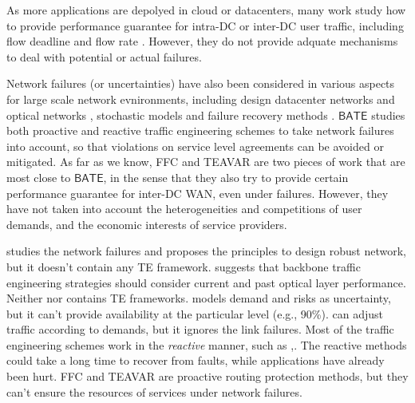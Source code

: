 \documentclass[sigconf]{acmart}
\begin{document}
As more applications are depolyed in cloud or datacenters, 
many work study how to provide performance guarantee for intra-DC or inter-DC user traffic, 
including flow deadline \cite{D2TCP, LPD, Guaranteeings} and flow rate \cite{appdriven, EyeQ}.
However, they do not provide adquate mechanisms to deal with potential or actual failures. 

Network failures (or uncertainties) have also been considered in various aspects for large scale network evnironments, including design datacenter networks \cite{evole} and optical networks \cite{Optical},  
stochastic models \cite{Stochastic} \cite{bi2019uncertainty-aware}
and failure recovery methods \cite{jointfailure, R3}. 
$\mathsf{BATE}$ studies both proactive and reactive traffic engineering schemes to 
take network failures into account, so that violations on service level agreements can be avoided or mitigated. 
As far as we know, FFC \cite{FFC} and TEAVAR \cite{Teavar} are two pieces of work that are 
most close to $\mathsf{BATE}$, 
in the sense that they also try to provide certain performance guarantee for inter-DC WAN, even under failures. 
However, they have not taken into account the heterogeneities and competitions of user demands, 
and the economic interests of service providers. 


\iffalse
\cite{evole} studies the network failures and proposes the principles to design robust network, but it doesn't contain any TE framework.
\cite{Optical} suggests that backbone traffic engineering strategies should consider current and past optical layer performance.
Neither \cite{evole} nor \cite{Optical} contains TE frameworks.
 \cite{Stochastic} models demand and risks as uncertainty, but it can't provide availability at the particular level (e.g., 90\%).
 \cite{bi2019uncertainty-aware} can adjust traffic according to demands, but it ignores the link failures.
 Most of the traffic engineering schemes work in the \textit{reactive} manner, such as \cite{jointfailure},\cite{R3}.
The reactive methods could take a long time to recover from faults, while applications have already been hurt\cite{FFC}.
FFC \cite{FFC} and TEAVAR\cite{Teavar} are proactive routing protection methods, but they can't ensure the resources of services under network failures.

\end{document}
